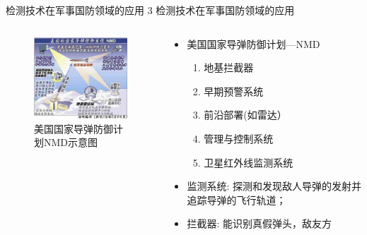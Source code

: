 \documentclass[10pt]{beamer}
\begin{document}
\begin{frame}{
检测技术在军事国防领域的应用}
3 检测技术在军事国防领域的应用\\
    \begin{columns}
        \begin{column}{0.6\textwidth}
             \begin{figure}[htbp] 
            \centering\includegraphics[width=2.5in]{source/intro4.jpg} \caption{美国国家导弹防御计划NMD示意图}\label{fig:4} 
            \end{figure}
        \end{column}
        \begin{column}{0.4\textwidth}
        \begin{itemize}
        \item \alert{美国国家导弹防御计划---NMD}
        \begin{enumerate}[(1)]
            \item 地基拦截器
            \item 早期预警系统
            \item 前沿部署(如雷达）
            \item 管理与控制系统
            \item 卫星红外线监测系统
     

        \end{enumerate}
        \item \alert{监测系统:}
         探测和发现敌人导弹的发射并追踪导弹的飞行轨道；
        \item \alert{拦截器:}
        能识别真假弹头，敌友方
        \end{itemize}
        \end{column}
        \end{columns}
\end{frame}
\end{document}
